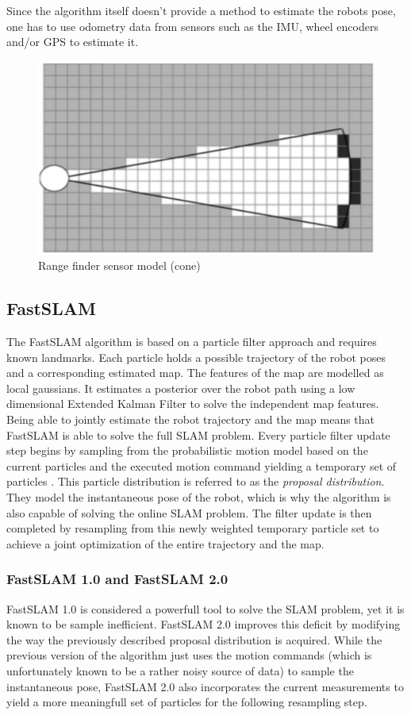 \documentclass[10pt,journal,compsoc]{IEEEtran}
\begin{document}
Since the algorithm itself doesn't provide a method to estimate the robots pose, one has to use odometry data from sensors such as the IMU, wheel encoders and/or GPS to estimate it.

\begin{figure}[thpb]
      \centering
      \includegraphics[width=0.4\linewidth]{img/occupancy_grid_sensor_model.png}
      \caption{Range finder sensor model (cone)}
      \label{fig:occupancy_grid_sensor_model}
\end{figure}

\subsection{FastSLAM}

The FastSLAM algorithm is based on a particle filter approach and requires known landmarks. Each particle holds a possible trajectory of the robot poses and a corresponding estimated map. The features of the map are modelled as local gaussians. 
It estimates a posterior over the robot path using a low dimensional Extended Kalman Filter to solve the independent map features. Being able to jointly estimate the robot trajectory and the map means that FastSLAM is able to solve the full SLAM problem. Every particle filter update step begins by sampling from the probabilistic motion model based on the current particles and the executed motion command yielding a temporary set of particles \cite{montemerlo_fastslam}. This particle distribution is referred to as the \textit{proposal distribution}. They model the instantaneous pose of the robot, which is why the algorithm is also capable of solving the online SLAM problem. The filter update is then completed by resampling from this newly weighted temporary particle set to achieve a joint optimization of the entire trajectory and the map.

\subsubsection{FastSLAM 1.0 and FastSLAM 2.0}
FastSLAM 1.0 is considered a powerfull tool to solve the SLAM problem, yet it is known to be sample inefficient. FastSLAM 2.0\cite{montemerlo_fastslam_2_0} improves this deficit by modifying the way the previously described proposal distribution is acquired. While the previous version of the algorithm just uses the motion commands (which is unfortunately known to be a rather noisy source of data) to sample the instantaneous pose, FastSLAM 2.0 also incorporates the current measurements to yield a more meaningfull set of particles for the following resampling step.
\end{document}
